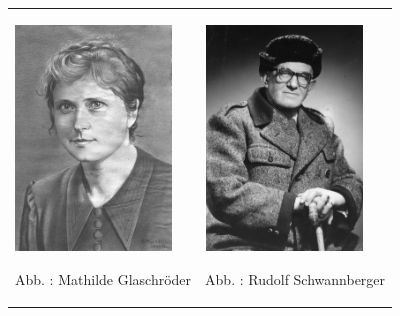 \begin{center}
\begin{minipage}{9.096cm}
\begin{flushleft}
\tablefirsthead{}
\tablehead{}
\tabletail{}
\tablelasttail{}
\begin{supertabular}{m{4.335cm}m{4.361cm}}

\includegraphics[width=4.154cm,height=5.985cm]{pictures/zulassungsarbeit-img076.jpg}

\label{bkm:Ref100231023}Abb. : Mathilde
Glaschröder &

\includegraphics[width=4.18cm,height=5.988cm]{pictures/zulassungsarbeit-img077.jpg}

\label{bkm:Ref100234796}Abb. : Rudolf
Schwannberger\\
\end{supertabular}
\end{flushleft}
\end{minipage}
\end{center}


